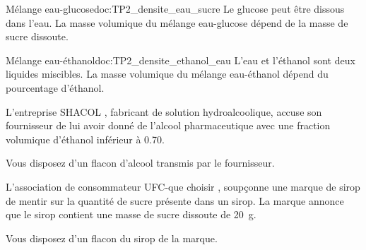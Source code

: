 \begin{multicols}{2}
  \begin{doc}{Mélange eau-glucose}{doc:TP2_densite_eau_sucre}
    Le glucose peut être dissous dans l'eau.
    La masse volumique du mélange eau-glucose dépend de la masse de sucre dissoute.
    \begin{center}
    \end{center}
  \end{doc}  
  
  \begin{doc}{Mélange eau-éthanol}{doc:TP2_densite_ethanol_eau}
    L'eau et l'éthanol sont deux liquides miscibles.
    La masse volumique du mélange eau-éthanol dépend du pourcentage d'éthanol.
    \begin{center}
    \end{center}
  \end{doc}
\end{multicols}


L'entreprise \og SHACOL \fg, fabricant de solution hydroalcoolique, accuse son fournisseur de lui avoir donné de l'alcool pharmaceutique avec une fraction volumique d'éthanol inférieur à \num{0,70}.

Vous disposez d'un flacon d'alcool transmis par le fournisseur.

\begin{center}
\end{center}



L'association de consommateur \og UFC-que choisir \fg, soupçonne une marque de sirop de mentir sur la quantité de sucre présente dans un sirop.
La marque annonce que le sirop contient une masse de sucre dissoute de \qty{20}{\g}.

Vous disposez d'un flacon du sirop de la marque.

\begin{center}
\end{center}